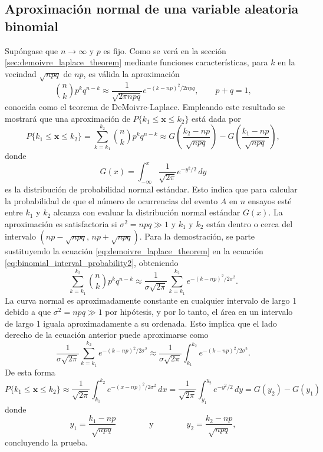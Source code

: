 \documentclass[a4paper]{report}
\newcommand{\x}{\mathbf{x}}
\begin{document}
\subsection{Aproximación normal de una variable aleatoria binomial}

Supóngase que \(n\to\infty\) y \(p\) es fijo. Como se verá en la sección \ref{sec:demoivre_laplace_theorem} mediante funciones características, para \(k\) en la vecindad \(\sqrt{npq}\) de \(np\), es válida la aproximación
\begin{equation}\label{eq:demoivre_laplace_theorem}
 \binom{n}{k}p^kq^{n-k}\approx\frac{1}{\sqrt{2\pi npq}}e^{-(k-np)^2/2npq},\qquad p+q=1,
\end{equation}
conocida como el teorema de DeMoivre-Laplace. Empleando este resultado se mostrará que una aproximación de \(P\{k_1\leq\x\leq k_2\}\) está dada por 
\begin{equation}\label{eq:binomial_normal_approximation}
 P\{k_1\leq\x\leq k_2\}=\sum_{k=k_1}^{k_2}\binom{n}{k}p^kq^{n-k}\approx G\left(\frac{k_2-np}{\sqrt{npq}}\right)-G\left(\frac{k_1-np}{\sqrt{npq}}\right),
\end{equation}
donde 
\[
 G(x)=\int_{-\infty}^x\frac{1}{\sqrt{2\pi}}e^{-y^2/2}\,dy
\]
es la distribución de probabilidad normal estándar. Esto indica que para calcular la probabilidad de que el número de ocurrencias del evento \(A\) en \(n\) ensayos esté entre \(k_1\) y \(k_2\) alcanza con evaluar la distribución normal estándar \(G(x)\). La aproximación es satisfactoria si \(\sigma^2=npq\gg 1\) y \(k_1\) y \(k_2\) están dentro o cerca del intervalo \((np-\sqrt{npq},\,np+\sqrt{npq})\). Para la demostración, se parte sustituyendo la ecuación \ref{eq:demoivre_laplace_theorem} en la ecuación \ref{eq:binomial_interval_probability2}, obteniendo
\begin{equation}\label{eq:binomial_normal_approximation_aux1}
 \sum_{k=k_1}^{k_2}\binom{n}{k}p^kq^{n-k}\approx\frac{1}{\sigma\sqrt{2\pi}}\sum_{k=k_1}^{k_2}e^{-(k-np)^2/2\sigma^2}.
\end{equation}
La curva normal es aproximadamente constante en cualquier intervalo de largo 1 debido a que \(\sigma^2=npq\gg 1\) por hipótesis, y por lo tanto, el área en un intervalo de largo 1 iguala aproximadamente a su ordenada. Esto implica que el lado derecho de la ecuación anterior puede aproximarse como
\begin{equation}\label{eq:binomial_normal_approximation_aux2}
 \frac{1}{\sigma\sqrt{2\pi}}\sum_{k=k_1}^{k_2}e^{-(k-np)^2/2\sigma^2}\approx
 \frac{1}{\sigma\sqrt{2\pi}}\int_{k_1}^{k_2}e^{-(k-np)^2/2\sigma^2}.
\end{equation}
De esta forma
\[
 P\{k_1\leq\x\leq k_2\}\approx\frac{1}{\sqrt{2\pi}}\int_{k_1}^{k_2}e^{-(x-np)^2/2\sigma^2}\,dx
 =\frac{1}{\sqrt{2\pi}}\int_{y_1}^{y_2}e^{-y^2/2}\,dy=G(y_2)-G(y_1)
\]
donde
\[
 y_1=\frac{k_1-np}{\sqrt{npq}}\qquad\qquad\textrm{y}\qquad\qquad y_2=\frac{k_2-np}{\sqrt{npq}},
\]
concluyendo la prueba.
\end{document}

